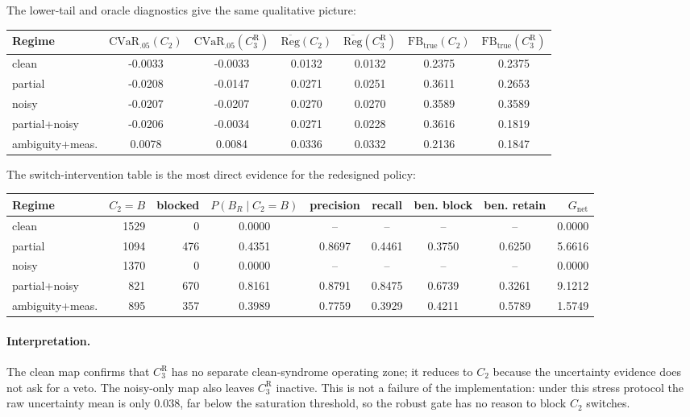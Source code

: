 \documentclass[11pt,a4paper]{article}
\theoremstyle{definition}
\theoremstyle{remark}
\begin{document}
The lower-tail and oracle diagnostics give the same qualitative picture:

\begin{center}
\scriptsize
\begin{tabular}{l|cc|cc|cc}
Regime
& $\mathrm{CVaR}_{.05}(C_2)$
& $\mathrm{CVaR}_{.05}(C_3^{\mathrm{R}})$
& $\overline{\mathrm{Reg}}(C_2)$
& $\overline{\mathrm{Reg}}(C_3^{\mathrm{R}})$
& $\mathrm{FB}_{\mathrm{true}}(C_2)$
& $\mathrm{FB}_{\mathrm{true}}(C_3^{\mathrm{R}})$
\\
\hline
clean & -0.0033 & -0.0033 & 0.0132 & 0.0132 & 0.2375 & 0.2375\\
partial & -0.0208 & -0.0147 & 0.0271 & 0.0251 & 0.3611 & 0.2653\\
noisy & -0.0207 & -0.0207 & 0.0270 & 0.0270 & 0.3589 & 0.3589\\
partial+noisy & -0.0206 & -0.0034 & 0.0271 & 0.0228 & 0.3616 & 0.1819\\
ambiguity+meas. & 0.0078 & 0.0084 & 0.0336 & 0.0332 & 0.2136 & 0.1847
\end{tabular}
\end{center}

The switch-intervention table is the most direct evidence for the redesigned policy:

\begin{center}
\scriptsize
\begin{tabular}{l|r|r|ccccc|r}
Regime
& $C_2=B$
& blocked
& $P(B_R\mid C_2=B)$
& precision
& recall
& ben. block
& ben. retain
& $G_{\mathrm{net}}$
\\
\hline
clean & 1529 & 0 & 0.0000 & -- & -- & -- & -- & 0.0000\\
partial & 1094 & 476 & 0.4351 & 0.8697 & 0.4461 & 0.3750 & 0.6250 & 5.6616\\
noisy & 1370 & 0 & 0.0000 & -- & -- & -- & -- & 0.0000\\
partial+noisy & 821 & 670 & 0.8161 & 0.8791 & 0.8475 & 0.6739 & 0.3261 & 9.1212\\
ambiguity+meas. & 895 & 357 & 0.3989 & 0.7759 & 0.3929 & 0.4211 & 0.5789 & 1.5749
\end{tabular}
\end{center}

\paragraph{Interpretation.}
The clean map confirms that $C_3^{\mathrm{R}}$ has no separate clean-syndrome operating
zone; it reduces to $C_2$ because the uncertainty evidence does not ask for a veto.
The noisy-only map also leaves $C_3^{\mathrm{R}}$ inactive.  This is not a failure of
the implementation: under this stress protocol the raw uncertainty mean is only
$0.038$, far below the saturation threshold, so the robust gate has no reason to block
$C_2$ switches.
\end{document}
